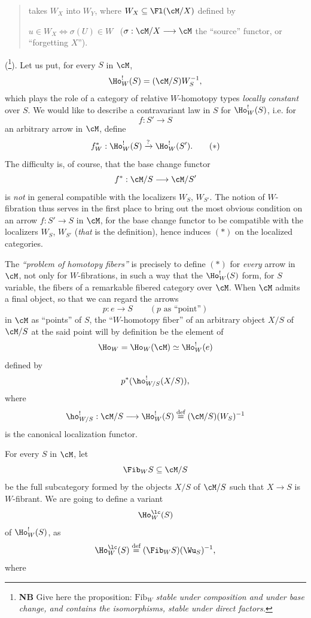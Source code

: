
\begin{quote}
takes $W_X$ into $W_Y$, where $W_X \subseteq \Fl(\cM/X)$ defined by

$u \in W_X \iff \sigma(U) \in W$ \ ($\sigma : \cM/X \longrightarrow \cM$ the ``source'' functor, or ``forgetting $X$''). %
\end{quote}

(\footnote[120]{\textbf{NB} Give here the proposition: $\mathrm{Fib}_W$ \textit{stable under composition and under base change, and contains the isomorphisms, stable under direct factors.}}). Let us put, for every $S$ in $\cM$,
\[
\Ho^!_W(S) = (\cM/S)W_S^{-1},
\]
which plays the role of a category of relative $W$-homotopy types \textit{locally constant} over $S$. We would like to describe a contravariant law in $S$ for $\Ho^!_W(S)$, i.e. for
\[
f : S' \longrightarrow S
\]
an arbitrary arrow in $\cM$, define
\[
f^*_W : \Ho^!_W(S) \xrightarrow{?} \Ho^!_W(S'). \tag*{$(*)$}
\]
The difficulty is, of course, that the base change functor
\[
f^* : \cM/S \longrightarrow \cM/S'
\]
is \textit{not} in general compatible with the  localizers $W_S$, $W_{S'}$. The notion of $W$-fibration thus serves in the first place to bring out the most obvious condition on an arrow $f : S' \longrightarrow S$ in $\cM$, for the base change functor to be compatible with the localizers $W_S$, $W_{S'}$ (\textit{that} is the definition), hence induces $(*)$ on the localized categories.

The \textit{``problem of homotopy fibers''} is precisely to define $(*)$ for \textit{every} arrow in $\cM$, not only for $W$-fibrations, in such a way that the $\Ho^!_W(S)$ form, for $S$ %
variable, the fibers of a remarkable fibered category over $\cM$. When $\cM$ admits a final object, so that we can regard the arrows
\[
p : e \longrightarrow S \qquad (p \text{ as ``point''})
\]
in $\cM$ as ``points'' of $S$, the ``$W$-homotopy fiber'' of an arbitrary object $X/S$ of $\cM/S$ at the said point will by definition be the element of
\[
\Ho_W = \Ho_W(\cM) \simeq \Ho^!_W(e)
\]
defined by
\[
p^*(\ho^!_{W/S}(X/S)),
\]
where
\[
\ho^!_{W/S} : \cM/S \longrightarrow \Ho^!_W(S) \overset{\text{def}}{=} (\cM/S)(W_S)^{-1}
\]
is the canonical localization functor.

For every $S$ in $\cM$, let
\[
\Fib_W S \subseteq \cM/S
\]
be the full subcategory formed by the objects $X/S$ of $\cM/S$ such that $X \longrightarrow S$ is $W$-fibrant. We are going to define a variant
\[
\Ho^{\lc}_W(S)
\]
of $\Ho^!_W(S)$, as
\[
\Ho^{\lc}_W(S) \overset{\text{def}}{=} (\Fib_W S)(\Wu_S)^{-1},
\]
where

